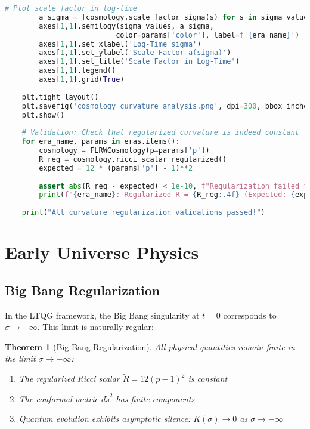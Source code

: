 \documentclass[11pt,a4paper]{article}
\newtheorem{theorem}{Theorem}[section]
\begin{document}
\begin{lstlisting}[language=Python, caption=Curvature Evolution Validation]
        # Plot scale factor in log-time
        a_sigma = [cosmology.scale_factor_sigma(s) for s in sigma_values]
        axes[1,1].semilogy(sigma_values, a_sigma, 
                          color=params['color'], label=f'{era_name}')
        axes[1,1].set_xlabel('Log-Time sigma')
        axes[1,1].set_ylabel('Scale Factor a(sigma)')
        axes[1,1].set_title('Scale Factor in Log-Time')
        axes[1,1].legend()
        axes[1,1].grid(True)
    
    plt.tight_layout()
    plt.savefig('cosmology_curvature_analysis.png', dpi=300, bbox_inches='tight')
    plt.show()
    
    # Validation: Check that regularized curvature is indeed constant
    for era_name, params in eras.items():
        cosmology = FLRWCosmology(p=params['p'])
        R_reg = cosmology.ricci_scalar_regularized()
        expected = 12 * (params['p'] - 1)**2
        
        assert abs(R_reg - expected) < 1e-10, f"Regularization failed for {era_name}"
        print(f"{era_name}: Regularized R = {R_reg:.4f} (Expected: {expected:.4f})")
    
    print("All curvature regularization validations passed!")
\end{lstlisting}

\section{Early Universe Physics}

\subsection{Big Bang Regularization}

In the LTQG framework, the Big Bang singularity at $t = 0$ corresponds to $\sigma \to -\infty$. This limit is naturally regular:

\begin{theorem}[Big Bang Regularization]
All physical quantities remain finite in the limit $\sigma \to -\infty$:
\begin{enumerate}
\item The regularized Ricci scalar $\tilde{R} = 12(p-1)^2$ is constant
\item The conformal metric $d\tilde{s}^2$ has finite components
\item Quantum evolution exhibits asymptotic silence: $K(\sigma) \to 0$ as $\sigma \to -\infty$
\end{enumerate}
\end{theorem}
\end{document}
